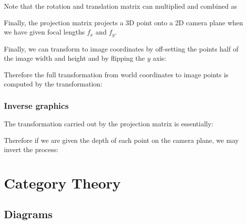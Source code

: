 \documentclass[12pt]{article}
\begin{document}
Note that the rotation and translation matrix can multiplied and combined as

Finally, the projection matrix projects a 3D point onto a 2D camera plane when we have given focal lengths $f_x$ and $f_y$.


Finally, we can transform to image coordinates by off-setting the points half of the image width and height and by flipping the $y$ axis:


Therefore the full transformation from world coordinates to image points is computed by the transformation:


\subsubsection{Inverse graphics}

The transformation carried out by the projection matrix is essentially:


Therefore if we are given the depth of each point on the camera plane, we may invert the process:


\section{Category Theory}

\subsection{Diagrams}

\end{document}
